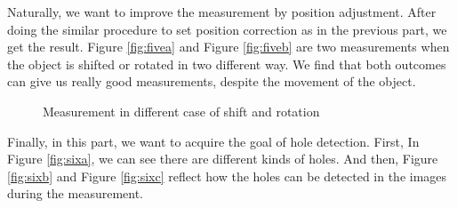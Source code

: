 \documentclass[english]{article}
\begin{document}
Naturally, we want to improve the measurement by position adjustment. After doing the similar procedure to set position correction as in the previous part, we get the result. Figure \ref{fig:fivea} and Figure \ref{fig:fiveb} are two measurements when the object is shifted or rotated in two different way. We find that both outcomes can give us really good measurements, despite the movement of the object. 

\begin{figure}[H]
	\centering
	\caption{Measurement in different case of shift and rotation}
	\label{fig:five}
\end{figure}

Finally, in this part, we want to acquire the goal of hole detection. First, In Figure \ref{fig:sixa}, we can see there are different kinds of holes. And then, Figure \ref{fig:sixb} and Figure \ref{fig:sixc} reflect how the holes can be detected in the images during the measurement. 
\end{document}
